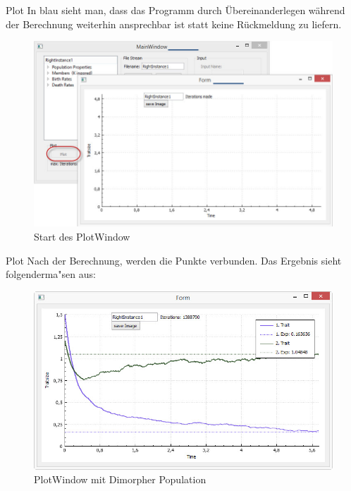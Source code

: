 \documentclass{beamer}
\begin{document}
\begin{frame}{Plot}
	In blau sieht man, dass das Programm durch Übereinanderlegen während der Berechnung weiterhin ansprechbar ist statt keine Rückmeldung zu liefern.
	\begin{figure}[H]
		\includegraphics[width=0.75\linewidth]{./Pictures/PlotWindow_start}
		\caption[PlotWindow_start]{Start des PlotWindow}
	\end{figure}
\end{frame}

\begin{frame}{Plot}
	Nach der Berechnung, werden die Punkte verbunden. Das Ergebnis sieht folgenderma"sen aus:
	\begin{figure}[H]
		\includegraphics[width=0.85\linewidth]{./Pictures/PlotWindow_smallBPDL}
		\caption[PlotWindow]{PlotWindow mit Dimorpher Population}
	\end{figure}
\end{frame}
\end{document}
